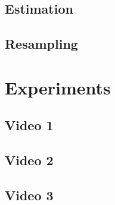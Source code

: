 \documentclass[10pt,a4paper,twoside]{article}
\begin{document}
\subsection{Estimation}
\subsection{Resampling}

\section{Experiments}
\subsection{Video 1}
\subsection{Video 2}
\subsection{Video 3}



\end{document}

